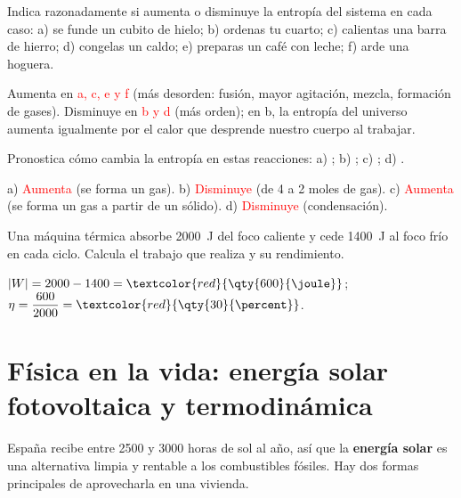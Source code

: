 \begin{exercise}
    Indica razonadamente si aumenta o disminuye la entropía del sistema en cada caso: a) se funde un cubito de hielo; b) ordenas tu
    cuarto; c) calientas una barra de hierro; d) congelas un caldo; e) preparas un café con leche; f) arde una hoguera.
    \begin{solu}
        Aumenta en \textcolor{red}{a, c, e y f} (más desorden: fusión, mayor agitación, mezcla, formación de gases). Disminuye en
        \textcolor{red}{b y d} (más orden); en b, la entropía del universo aumenta igualmente por el calor que desprende nuestro
        cuerpo al trabajar.
    \end{solu}
\end{exercise}

\begin{exercise}
    Pronostica cómo cambia la entropía en estas reacciones: a) ; b) ; c) ; d) .
    \begin{solu}
        a) \textcolor{red}{Aumenta} (se forma un gas). b) \textcolor{red}{Disminuye} (de 4 a 2 moles de gas). c)
        \textcolor{red}{Aumenta} (se forma un gas a partir de un sólido). d) \textcolor{red}{Disminuye} (condensación).
    \end{solu}
\end{exercise}

\begin{exercise}
    Una máquina térmica absorbe \qty{2000}{\joule} del foco caliente y cede \qty{1400}{\joule} al foco frío en cada ciclo. Calcula el
    trabajo que realiza y su rendimiento.
    \begin{solu}
        \(|W| = 2000 - 1400 = \textcolor{red}{\qty{600}{\joule}}\); \(\eta = \dfrac{600}{2000} = \textcolor{red}{\qty{30}{\percent}}\).
    \end{solu}
\end{exercise}

\section{Física en la vida: energía solar fotovoltaica y termodinámica}\label{sec:ud13-solar}

España recibe entre \num{2500} y \num{3000} horas de sol al año, así que la \textbf{energía solar} es una alternativa limpia y
rentable a los combustibles fósiles. Hay dos formas principales de aprovecharla en una vivienda.

